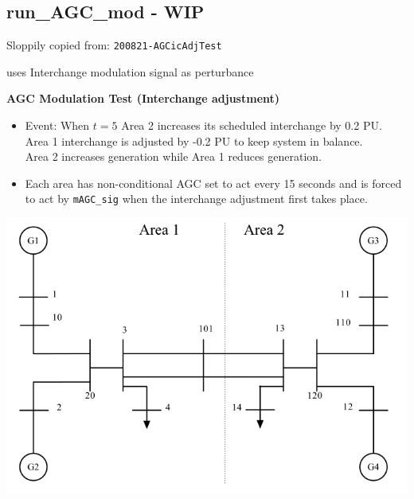 \pagebreak
\subsection{run\_AGC\_mod - WIP}
Sloppily copied from: \verb|200821-AGCicAdjTest|

uses Interchange modulation signal as perturbance

\textbf{AGC Modulation Test (Interchange adjustment) } \ \\

\begin{minipage}{0.5\linewidth}
\begin{itemize}
\raggedright
\item Event: When $t=5$ Area 2 increases its scheduled interchange by 0.2 PU.\\
Area 1 interchange is adjusted by -0.2 PU to keep system in balance.\\
Area 2 increases generation while Area 1 reduces generation.

\item Each area has non-conditional AGC set to act every 15 seconds and is forced to act by \verb|mAGC_sig| when the interchange adjustment first takes place.

\end{itemize}
\vfill
\end{minipage}\hspace{2em}%
\begin{minipage}{0.4\linewidth}
\centering
\includegraphics[width=\linewidth]{examples/agcMod/sysOneLineAreas}
\end{minipage}%


